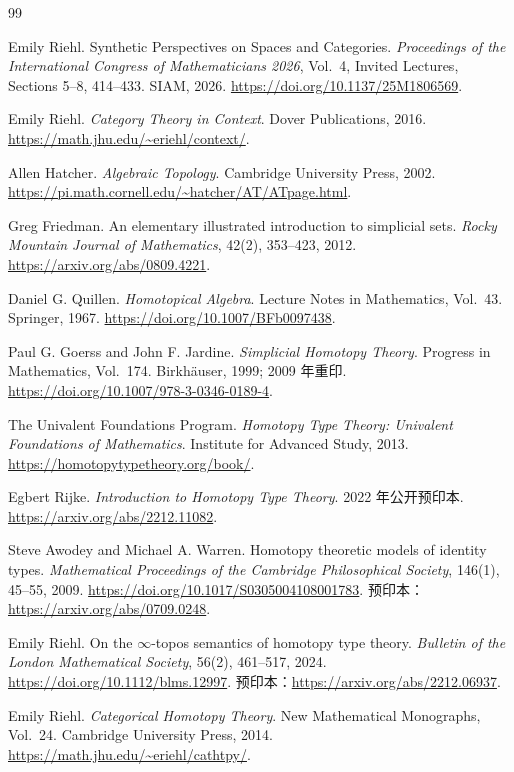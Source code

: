\documentclass[12pt,oneside,openany,fontset=none]{ctexbook}
\theoremstyle{cn}
\numberwithin{equation}{chapter}
\begin{document}
\begin{thebibliography}{99}

Emily Riehl.
Synthetic Perspectives on Spaces and Categories.
\emph{Proceedings of the International Congress of Mathematicians 2026}, Vol.~4, Invited Lectures, Sections 5--8, 414--433. SIAM, 2026.
\url{https://doi.org/10.1137/25M1806569}.

Emily Riehl.
\emph{Category Theory in Context}.
Dover Publications, 2016.
\url{https://math.jhu.edu/~eriehl/context/}.

Allen Hatcher.
\emph{Algebraic Topology}.
Cambridge University Press, 2002.
\url{https://pi.math.cornell.edu/~hatcher/AT/ATpage.html}.

Greg Friedman.
An elementary illustrated introduction to simplicial sets.
\emph{Rocky Mountain Journal of Mathematics}, 42(2), 353--423, 2012.
\url{https://arxiv.org/abs/0809.4221}.

Daniel G. Quillen.
\emph{Homotopical Algebra}.
Lecture Notes in Mathematics, Vol.~43. Springer, 1967.
\url{https://doi.org/10.1007/BFb0097438}.

Paul G. Goerss and John F. Jardine.
\emph{Simplicial Homotopy Theory}.
Progress in Mathematics, Vol.~174. Birkh\"auser, 1999; 2009 年重印.
\url{https://doi.org/10.1007/978-3-0346-0189-4}.

The Univalent Foundations Program.
\emph{Homotopy Type Theory: Univalent Foundations of Mathematics}.
Institute for Advanced Study, 2013.
\url{https://homotopytypetheory.org/book/}.

Egbert Rijke.
\emph{Introduction to Homotopy Type Theory}.
2022 年公开预印本.
\url{https://arxiv.org/abs/2212.11082}.

Steve Awodey and Michael A. Warren.
Homotopy theoretic models of identity types.
\emph{Mathematical Proceedings of the Cambridge Philosophical Society}, 146(1), 45--55, 2009.
\url{https://doi.org/10.1017/S0305004108001783}.
预印本：\url{https://arxiv.org/abs/0709.0248}.

Emily Riehl.
On the $\infty$-topos semantics of homotopy type theory.
\emph{Bulletin of the London Mathematical Society}, 56(2), 461--517, 2024.
\url{https://doi.org/10.1112/blms.12997}.
预印本：\url{https://arxiv.org/abs/2212.06937}.

Emily Riehl.
\emph{Categorical Homotopy Theory}.
New Mathematical Monographs, Vol.~24. Cambridge University Press, 2014.
\url{https://math.jhu.edu/~eriehl/cathtpy/}.


\end{thebibliography}
\end{document}
